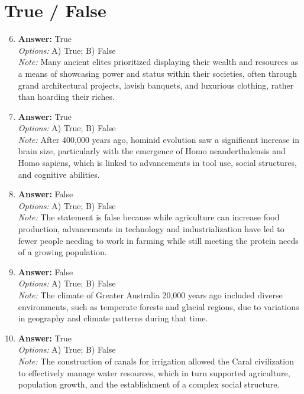 \documentclass[12pt]{article}
\begin{document}
\section*{True / False}
\begin{enumerate}[label=\arabic*.]
\setcounter{enumi}{5}
\item \textbf{Answer:} True
\\ \textit{Options:} A) True; B) False
\\ \textit{Note:} Many ancient elites prioritized displaying their wealth and resources as a means of showcasing power and status within their societies, often through grand architectural projects, lavish banquets, and luxurious clothing, rather than hoarding their riches.
\item \textbf{Answer:} True
\\ \textit{Options:} A) True; B) False
\\ \textit{Note:} After 400,000 years ago, hominid evolution saw a significant increase in brain size, particularly with the emergence of Homo neanderthalensis and Homo sapiens, which is linked to advancements in tool use, social structures, and cognitive abilities.
\item \textbf{Answer:} False
\\ \textit{Options:} A) True; B) False
\\ \textit{Note:} The statement is false because while agriculture can increase food production, advancements in technology and industrialization have led to fewer people needing to work in farming while still meeting the protein needs of a growing population.
\item \textbf{Answer:} False
\\ \textit{Options:} A) True; B) False
\\ \textit{Note:} The climate of Greater Australia 20,000 years ago included diverse environments, such as temperate forests and glacial regions, due to variations in geography and climate patterns during that time.
\item \textbf{Answer:} True
\\ \textit{Options:} A) True; B) False
\\ \textit{Note:} The construction of canals for irrigation allowed the Caral civilization to effectively manage water resources, which in turn supported agriculture, population growth, and the establishment of a complex social structure.
\end{enumerate}
\end{document}
